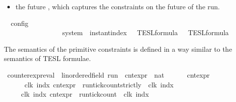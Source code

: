 \begin{isabellebody}
\begin{isamarkuptext}
\begin{itemize}
\item the future \isa{{\isasymPhi}}, which captures the constraints on the future of the run.%
\end{itemize}%
\end{isamarkuptext}\isamarkuptrue%
\isamarkupfalse%
\ {\isacharprime}{\isasymtau}\ config\ {\isacharequal}\isanewline
\ \ \ \ \ \ \ \ \ \ \ \ \ \ \ \ {\isacartoucheopen}{\isacharprime}{\isasymtau}\ system\ {\isacharasterisk}\ instant{\isacharunderscore}index\ {\isacharasterisk}\ {\isacharprime}{\isasymtau}\ TESL{\isacharunderscore}formula\ {\isacharasterisk}\ {\isacharprime}{\isasymtau}\ TESL{\isacharunderscore}formula{\isacartoucheclose}%
\isadelimdocument
%
\endisadelimdocument
%
\isatagdocument
%
\isamarkuptrue%
%
\endisatagdocument
{\isafolddocument}%
%
\isadelimdocument
%
\endisadelimdocument
%
\begin{isamarkuptext}%
The semantics of the primitive constraints is defined in a way similar to
  the semantics of TESL formulae.%
\end{isamarkuptext}\isamarkuptrue%
\isamarkupfalse%
\ counter{\isacharunderscore}expr{\isacharunderscore}eval\ {\isacharcolon}{\isacharcolon}\ {\isacartoucheopen}{\isacharparenleft}{\isacharprime}{\isasymtau}{\isacharcolon}{\isacharcolon}linordered{\isacharunderscore}field{\isacharparenright}\ run\ {\isasymRightarrow}\ cnt{\isacharunderscore}expr\ {\isasymRightarrow}\ nat{\isacartoucheclose}\isanewline
\ \ {\isacharparenleft}{\isacartoucheopen}{\isasymlbrakk}\ {\isacharunderscore}\ {\isasymturnstile}\ {\isacharunderscore}\ {\isasymrbrakk}\isactrlsub c\isactrlsub n\isactrlsub t\isactrlsub e\isactrlsub x\isactrlsub p\isactrlsub r{\isacartoucheclose}{\isacharparenright}\isanewline
{}\isanewline
\ \ {\isacartoucheopen}{\isasymlbrakk}\ {\isasymrho}\ {\isasymturnstile}\ {\isacharhash}\isactrlsup {\isacharless}\ clk\ indx\ {\isasymrbrakk}\isactrlsub c\isactrlsub n\isactrlsub t\isactrlsub e\isactrlsub x\isactrlsub p\isactrlsub r\ {\isacharequal}\ run{\isacharunderscore}tick{\isacharunderscore}count{\isacharunderscore}strictly\ {\isasymrho}\ clk\ indx{\isacartoucheclose}\isanewline
{\isacharbar}\ {\isacartoucheopen}{\isasymlbrakk}\ {\isasymrho}\ {\isasymturnstile}\ {\isacharhash}\isactrlsup {\isasymle}\ clk\ indx\ {\isasymrbrakk}\isactrlsub c\isactrlsub n\isactrlsub t\isactrlsub e\isactrlsub x\isactrlsub p\isactrlsub r\ {\isacharequal}\ run{\isacharunderscore}tick{\isacharunderscore}count\ {\isasymrho}\ clk\ indx{\isacartoucheclose}\isanewline

\end{isabellebody}
